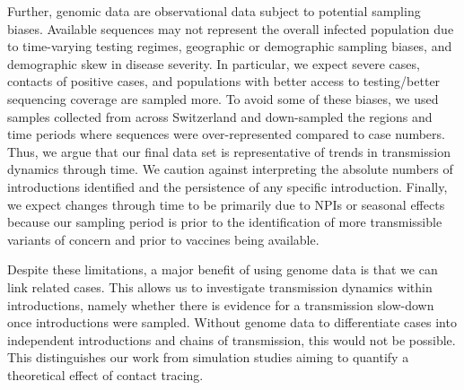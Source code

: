\documentclass[9pt,twoside,lineno]{pnas-new} %
\begin{document}
Further, genomic data are observational data subject to potential sampling biases. Available sequences may not represent the overall infected population due to time-varying testing regimes, geographic or demographic sampling biases, and demographic skew in disease severity. In particular, we expect severe cases, contacts of positive cases, and populations with better access to testing/better sequencing coverage are sampled more. To avoid some of these biases, we used samples collected from across Switzerland and down-sampled the regions and time periods where sequences were over-represented compared to case numbers. Thus, we argue that our final data set is representative of trends in transmission dynamics through time. We caution against interpreting the absolute numbers of introductions identified and the persistence of any specific introduction. Finally, we expect changes through time to be primarily due to NPIs or seasonal effects because our sampling period is prior to the identification of more transmissible variants of concern and prior to vaccines being available. 

Despite these limitations, a major benefit of using genome data is that we can link related cases. This allows us to investigate transmission dynamics within introductions, namely whether there is evidence for a transmission slow-down once introductions were sampled. Without genome data to differentiate cases into independent introductions and chains of transmission, this would not be possible. This distinguishes our work from simulation studies aiming to quantify a theoretical effect of contact tracing. 
\end{document}
